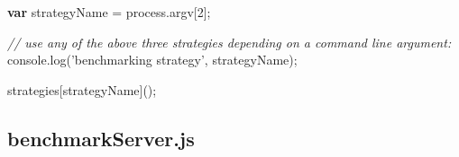 \documentclass[12pt, ]{article}
\newenvironment{Shaded}{}{}
\newcommand{\KeywordTok}[1]{\textcolor[rgb]{0.00,0.44,0.13}{\textbf{{#1}}}}
\newcommand{\DecValTok}[1]{\textcolor[rgb]{0.25,0.63,0.44}{{#1}}}
\newcommand{\StringTok}[1]{\textcolor[rgb]{0.25,0.44,0.63}{{#1}}}
\newcommand{\CommentTok}[1]{\textcolor[rgb]{0.38,0.63,0.69}{\textit{{#1}}}}
\newcommand{\OtherTok}[1]{\textcolor[rgb]{0.00,0.44,0.13}{{#1}}}
\newcommand{\FunctionTok}[1]{\textcolor[rgb]{0.02,0.16,0.49}{{#1}}}
\newcommand{\NormalTok}[1]{{#1}}
\begin{document}
\begin{Shaded}
\begin{Highlighting}[]
\KeywordTok{var} \NormalTok{strategyName = }\OtherTok{process}\NormalTok{.}\FunctionTok{argv}\NormalTok{[}\DecValTok{2}\NormalTok{];}

\CommentTok{// use any of the above three strategies depending on a command line argument:}
\OtherTok{console}\NormalTok{.}\FunctionTok{log}\NormalTok{(}\StringTok{'benchmarking strategy'}\NormalTok{, strategyName);}

\NormalTok{strategies[strategyName]();}

\end{Highlighting}
\end{Shaded}

\pagebreak

\subsection{benchmarkServer.js}\label{headerux5fbenchmarkServer}

\label{src_benchmarkServer}
\end{document}
